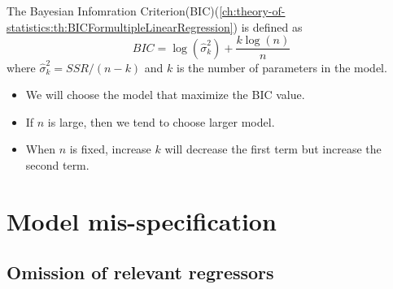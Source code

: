 \begin{refsection}
\begin{definition}
	The Bayesian Infomration Criterion(BIC)(\autoref{ch:theory-of-statistics:th:BICFormultipleLinearRegression}) is defined as
	$$BIC = \log(\hat{\sigma}_k^2) + \frac{k\log(n)}{n}$$
	where $\hat{\sigma}_k^2 = SSR/(n-k)$ and $k$ is the number of parameters in the model.
\end{definition}

\begin{remark}\hfill
	\begin{itemize}
		\item We will choose the model that maximize the BIC value.
		\item If $n$ is large, then we tend to choose larger model.
		\item When $n$ is fixed, increase $k$ will decrease the first term but increase the second term.
	\end{itemize}
\end{remark}


\section{Model mis-specification}
\subsection{Omission of relevant regressors}



\end{refsection}
